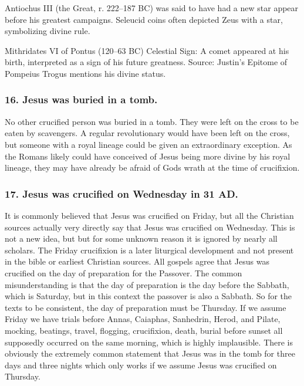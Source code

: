 Antiochus III (the Great, r.
222--187 BC) was said to have had a new star appear before his greatest campaigns.
Seleucid coins often depicted Zeus with a star, symbolizing divine rule.

Mithridates VI of Pontus (120--63 BC) Celestial Sign: A comet appeared at his birth, interpreted as a sign of his future greatness.
Source: Justin's Epitome of Pompeius Trogus mentions his divine status.

\subsubsection{16.
Jesus was buried in a tomb.}\label{par:jesus-was-buried-in-a-tomb.}

No other crucified person was buried in a tomb.
They were left on the cross to be eaten by scavengers.
A regular revolutionary would have been left on the cross, but someone with a royal lineage could be given an extraordinary exception.
As the Romans likely could have conceived of Jesus being more divine by his royal lineage, they may have already be afraid of Gods wrath at the time of crucifixion.

\subsubsection{17.
Jesus was crucified on Wednesday in 31 AD.}\label{par:jesus-was-crucified-on-wednesday-in-31-ad.}

It is commonly believed that Jesus was crucified on Friday, but all the Christian sources actually very directly say that Jesus was crucified on Wednesday.
This is not a new idea, but but for some unknown reason it is ignored by nearly all scholars.
The Friday crucifixion is a later liturgical development and not present in the bible or earliest Christian sources.
All gospels agree that Jesus was crucified on the day of preparation for the Passover.
The common misunderstanding is that the day of preparation is the day before the Sabbath, which is Saturday, but in this context the passover is also a Sabbath.
So for the texts to be consistent, the day of preparation must be Thursday.
If we assume Friday we have trials before Annas, Caiaphas, Sanhedrin, Herod, and Pilate, mocking, beatings, travel, flogging, crucifixion, death, burial before sunset all supposedly occurred on the same morning, which is highly implausible.
There is obviously the extremely common statement that Jesus was in the tomb for three days and three nights which only works if we assume Jesus was crucified on Thursday.

